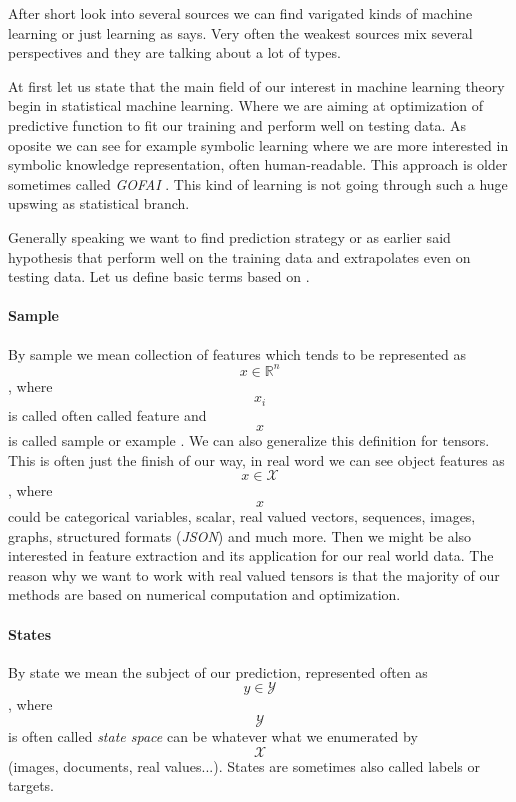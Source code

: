 After short look into several sources we can find varigated kinds of machine learning or just learning as \cite{Russell2009} says. Very often the weakest sources mix several perspectives and they are talking about a lot of types.

At first let us state that the main field of our interest in machine learning theory begin in statistical machine learning. Where we are aiming at optimization of predictive function to fit our training and perform well on testing data. As oposite we can see for example symbolic learning where we are more interested in symbolic knowledge representation, often human-readable. This approach is older sometimes called \emph{GOFAI} \cite{Haugeland1985}. This kind of learning is not going through such a huge upswing as statistical branch.

Generally speaking we want to find prediction strategy or as earlier said hypothesis that perform well on the training data and extrapolates even on testing data. Let us define basic terms based on \cite{Franc2020}.


\paragraph{Sample}
By sample we mean collection of features which tends to be represented as $$x \in \mathbb{R}^{n}$$, where $$x_i$$ is called often called feature and $$x$$ is called sample or example \cite{GoodBengCour16}. We can also generalize this definition for tensors.
This is often just the finish of our way, in real word we can see object features as $$x \in \mathcal{X}$$, where $$x$$ could be categorical variables, scalar, real valued vectors, sequences, images, graphs, structured formats (\emph{JSON}) and much more. Then we might be also interested in feature extraction and its application for our real world data. The reason why we want to work with real valued tensors is that the majority of our methods are based on numerical computation and optimization. 
\paragraph{States}
By state we mean the subject of our prediction, represented often as $$y \in \mathcal{Y}$$, where $$\mathcal{Y}$$ is often called \emph{state space} can be whatever what we enumerated by $$\mathcal{X}$$ (images, documents, real values...). States are sometimes also called labels or targets. 
